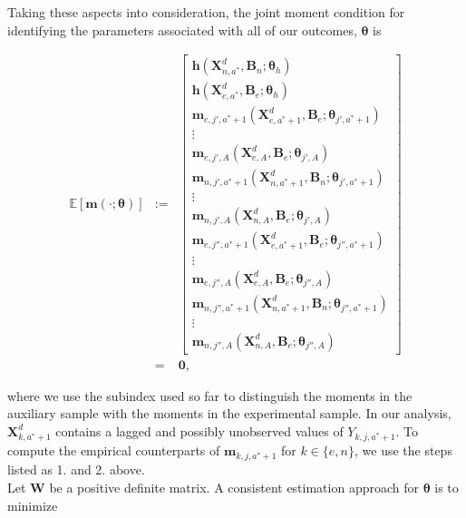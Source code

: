 \noindent Taking these aspects into consideration, the joint moment condition for identifying the parameters associated with all of our outcomes, $\bm{\theta}$ is 




\begin{eqnarray}
\mathbb{E} \left[ \bm{m} \left( \cdot ; \bm{\theta} \right) \right] &:=&
\begin{bmatrix}
 \mathbf{h} \left(  \bm{X}_{n,a^*}^d, \bm{B}_{n}; \bm{\theta}_{h}  \right) \\  \mathbf{h} \left(  \bm{X}_{e,a^*}^d, \bm{B}_{e}; \bm{\theta}_{h}  \right) \\
\bm{m}_{e,j',a^*+1} \left( \bm{X}_{e,a^*+1}^d, \bm{B}_{e}; \bm{\theta}_{j',a^*+1} \right) \\ \vdots \\  \bm{m}_{e,j',A} \left( \bm{X}_{e,A}^d, \bm{B}_{e}; \bm{\theta}_{j',A} \right) \\
\bm{m}_{n,j',a^*+1} \left( \bm{X}_{n,a^*+1}^d, \bm{B}_{n}; \bm{\theta}_{j',a^*+1} \right) \\ \vdots \\  \bm{m}_{n,j',A} \left( \bm{X}_{n,A}^d, \bm{B}_{e}; \bm{\theta}_{j',A} \right) \\
\bm{m}_{e,j'',a^*+1} \left( \bm{X}_{e,a^*+1}^d, \bm{B}_{e}; \bm{\theta}_{j'',a^*+1} \right) \\ \vdots \\  \bm{m}_{e,j'',A} \left( \bm{X}_{e,A}^d, \bm{B}_{e}; \bm{\theta}_{j'',A} \right) \\
\bm{m}_{n,j'',a^*+1} \left( \bm{X}_{n,a^*+1}^d, \bm{B}_{n}; \bm{\theta}_{j'',a^*+1} \right) \\ \vdots \\  \bm{m}_{n,j'',A} \left( \bm{X}_{n,A}^d, \bm{B}_{e}; \bm{\theta}_{j'',A} \right) 
 \label{eq:loss}
\end{bmatrix}  \\ \nonumber
&=& \bm{0}, \label{eq:MOMENT}
\end{eqnarray}

\noindent where we use the subindex used so far to distinguish the moments in the auxiliary sample with the moments in the experimental sample. In our analysis, $\bm{X}_{k,a^*+1}^d$ contains a lagged and possibly unobserved values of $Y_{k,j,a^*+1}$. To compute the empirical counterparts of $\bm{m}_{k,j,a^*+1}$ for $k \in \{e, n\}$, we use the steps listed as 1. and 2. above.\\

\noindent Let $\bm{W}$ be a positive definite matrix. A consistent estimation approach for $\bm{\theta}$ is to minimize 

